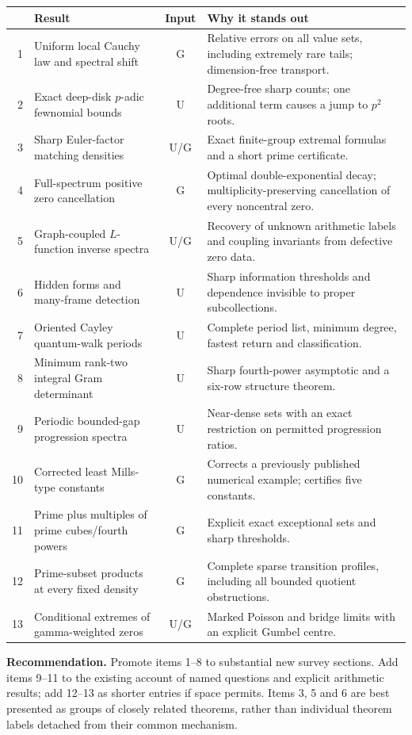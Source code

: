 \documentclass[11pt]{article}
\begin{document}
\begin{tabularx}{\textwidth}{@{}r>{\raggedright\arraybackslash}p{}c>{\raggedright\arraybackslash}X@{}}
\toprule
&Result & Input & Why it stands out\\\midrule
1 & Uniform local Cauchy law and spectral shift & G & Relative errors on all value sets, including extremely rare tails; dimension-free transport.\\
2 & Exact deep-disk $p$-adic fewnomial bounds & U & Degree-free sharp counts; one additional term causes a jump to $p^2$ roots.\\
3 & Sharp Euler-factor matching densities & U/G & Exact finite-group extremal formulas and a short prime certificate.\\
4 & Full-spectrum positive zero cancellation & G & Optimal double-exponential decay; multiplicity-preserving cancellation of every noncentral zero.\\
5 & Graph-coupled $L$-function inverse spectra & U/G & Recovery of unknown arithmetic labels and coupling invariants from defective zero data.\\
6 & Hidden forms and many-frame detection & U & Sharp information thresholds and dependence invisible to proper subcollections.\\
7 & Oriented Cayley quantum-walk periods & U & Complete period list, minimum degree, fastest return and classification.\\
8 & Minimum rank-two integral Gram determinant & U & Sharp fourth-power asymptotic and a six-row structure theorem.\\
9 & Periodic bounded-gap progression spectra & U & Near-dense sets with an exact restriction on permitted progression ratios.\\
10 & Corrected least Mills-type constants & G & Corrects a previously published numerical example; certifies five constants.\\
11 & Prime plus multiples of prime cubes/fourth powers & G & Explicit exact exceptional sets and sharp thresholds.\\
12 & Prime-subset products at every fixed density & G & Complete sparse transition profiles, including all bounded quotient obstructions.\\
13 & Conditional extremes of gamma-weighted zeros & U/G & Marked Poisson and bridge limits with an explicit Gumbel centre.\\\bottomrule
\end{tabularx}

\textbf{Recommendation.} Promote items 1--8 to substantial new survey sections. Add items 9--11 to the existing account of named questions and explicit arithmetic results; add 12--13 as shorter entries if space permits. Items 3, 5 and 6 are best presented as groups of closely related theorems, rather than individual theorem labels detached from their common mechanism.
\clearpage
\end{document}
